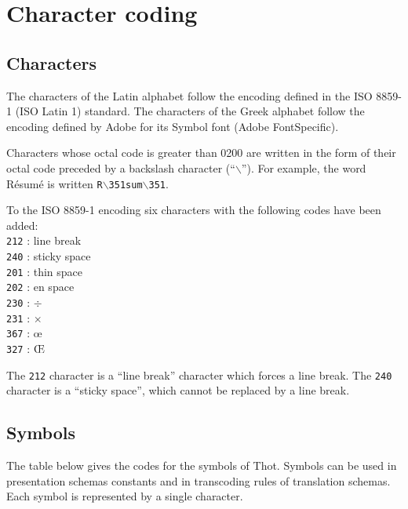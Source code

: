 \chapter{Character coding}
\label{codage}

\section{Characters}

The characters of the Latin alphabet follow the encoding defined in
the ISO 8859-1 (ISO Latin 1) standard.  The characters of the Greek
alphabet follow the encoding defined by Adobe for its Symbol font
(Adobe FontSpecific).

Characters whose octal code is greater than 0200 are written in the
form of their octal code preceded by a backslash character
(``$\backslash$'').  For example, the word R\'{e}sum\'{e} is written
{\tt R$\backslash$351sum$\backslash$351}.

To the ISO 8859-1 encoding six characters with the following codes
have been added: \\
{\tt 212} : line break\\
{\tt 240} : sticky space\\
{\tt 201} : thin space\\
{\tt 202} : en space\\
{\tt 230} : $\div$\\
{\tt 231} : $\times$\\
{\tt 367} : \oe\\
{\tt 327} : \OE 

The {\tt 212} character is a ``line break'' character which forces a
line break.  The {\tt 240} character is a ``sticky space'', which
cannot be replaced by a line break.

\section{Symbols}
\label{codesymbole}

The table below gives the codes for the symbols of Thot.  Symbols can
be used in presentation schemas constants and in transcoding rules of
translation schemas.  Each symbol is represented by a single
character.

